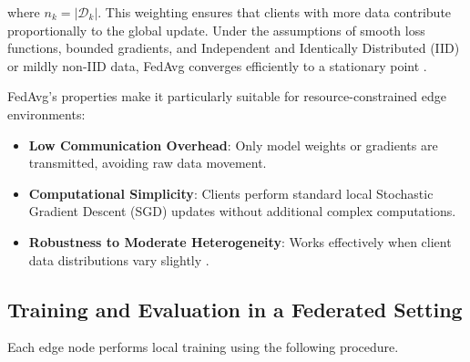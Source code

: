 where $n_k = |\mathcal{D}_k|$. This weighting ensures that clients with more 
data contribute proportionally to the global update. Under the assumptions of 
smooth loss functions, bounded gradients, and Independent and Identically 
Distributed (IID) or mildly non-IID data, FedAvg converges efficiently to a 
stationary point \cite{li2020federated, mcmahan2017communication}.

FedAvg’s properties make it particularly suitable for resource-constrained edge 
environments:

\begin{itemize}
    \item \textbf{Low Communication Overhead}: Only model weights or gradients 
    are transmitted, avoiding raw data movement.
    
    \item \textbf{Computational Simplicity}: Clients perform standard local 
    Stochastic Gradient Descent (SGD) updates without additional complex 
    computations.
    
    \item \textbf{Robustness to Moderate Heterogeneity}: Works effectively when 
    client data distributions vary slightly \cite{li2020federated}.
\end{itemize}

\subsection{Training and Evaluation in a Federated Setting}
\label{subsec:fl_training}

Each edge node performs local training using the following procedure.

